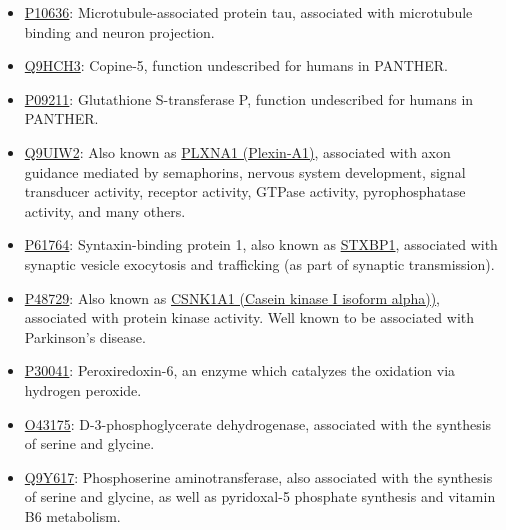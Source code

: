 {\small

\begin{itemize}
\item \href{http://www.pantherdb.org/genes/gene.do?acc=HUMAN\%7CHGNC\%3D6893\%7CUniProtKB\%3DP10636}{P10636}: Microtubule-associated protein tau, associated with microtubule binding and neuron projection.
\item \href{http://www.pantherdb.org/genes/gene.do?acc=HUMAN\%7CHGNC\%3D2318\%7CUniProtKB\%3DQ9HCH3}{Q9HCH3}: Copine-5, function undescribed for humans in PANTHER.
\item \href{http://www.pantherdb.org/genes/gene.do?acc=HUMAN\%7CHGNC\%3D4638\%7CUniProtKB\%3DP09211}{P09211}: Glutathione S-transferase P, function undescribed for humans in PANTHER.
\item \href{http://www.pantherdb.org/genes/gene.do?acc=HUMAN\%7CHGNC\%3D9099\%7CUniProtKB\%3DQ9UIW2}{Q9UIW2}: Also known as \href{https://www.uniprot.org/uniprot/Q9UIW2}{PLXNA1 (Plexin-A1)}, associated with axon guidance mediated by semaphorins, nervous system development, signal transducer activity, receptor activity, GTPase activity, pyrophosphatase activity, and many others.
\item \href{http://www.pantherdb.org/genes/gene.do?acc=HUMAN\%7CHGNC\%3D11444\%7CUniProtKB\%3DP61764}{P61764}: Syntaxin-binding protein 1, also known as \href{https://www.uniprot.org/uniprot/P61764}{STXBP1}, associated with synaptic vesicle exocytosis and trafficking (as part of synaptic transmission).
\item \href{http://www.pantherdb.org/genes/gene.do?acc=HUMAN\%7CHGNC\%3D2451\%7CUniProtKB\%3DP48729}{P48729}: Also known as \href{https://www.uniprot.org/uniprot/P48729}{CSNK1A1 (Casein kinase I isoform alpha))}, associated with protein kinase activity. Well known to be associated with Parkinson's disease.
\item \href{http://www.pantherdb.org/genes/gene.do?acc=HUMAN\%7CHGNC\%3D16753\%7CUniProtKB\%3DP30041}{P30041}: Peroxiredoxin-6, an enzyme which catalyzes the oxidation via hydrogen peroxide.
\item \href{http://www.pantherdb.org/genes/gene.do?acc=HUMAN\%7CHGNC\%3D8923\%7CUniProtKB\%3DO43175}{O43175}: D-3-phosphoglycerate dehydrogenase, associated with the synthesis of serine and glycine.
\item \href{http://www.pantherdb.org/genes/gene.do?acc=HUMAN\%7CHGNC\%3D19129\%7CUniProtKB\%3DQ9Y617}{Q9Y617}: Phosphoserine aminotransferase, also associated with the synthesis of serine and glycine, as well as pyridoxal-5 phosphate synthesis and vitamin B6 metabolism.

\end{itemize}}
